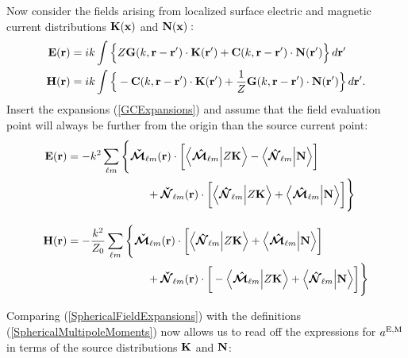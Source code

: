 \documentclass[letterpaper]{article}
\begin{document}
Now consider the fields arising from localized surface electric
and magnetic current distributions $\mathbf{K}(\mathbf{x})$ and $\mathbf{N}(\mathbf{x}):$
\begin{align*}
 \mathbf{E}(\mathbf{r}) 
&= 
   ik\int \Big\{ Z\mathbf{G}(k, \mathbf{r}-\mathbf{r}^\prime) \cdot \mathbf{K}(\mathbf{r}^\prime)
                 +\mathbf{C}(k, \mathbf{r}-\mathbf{r}^\prime) \cdot \mathbf{N}(\mathbf{r}^\prime)
          \Big\} \, d\mathbf{r}^\prime
\\
 \mathbf{H}(\mathbf{r}) 
&= 
   ik\int \Big\{ -\mathbf{C}(k, \mathbf{r}-\mathbf{r}^\prime) \cdot \mathbf{K}(\mathbf{r}^\prime)
                 +\frac{1}{Z}\mathbf{G}(k, \mathbf{r}-\mathbf{r}^\prime) \cdot \mathbf{N}(\mathbf{r}^\prime)
          \Big\}\,d\mathbf{r}^\prime.
\end{align*}
Insert the expansions (\ref{GCExpansions}) and assume that the 
field evaluation point will always be further from the origin than
the source current point: 
\begin{subequations}
\begin{align*}
 \mathbf{E}(\mathbf{r}) 
&= 
 -k^2 \sum_{\ell m} 
       \Bigg\{ \boldsymbol{\check{\mathcal{M}}}_{\ell m}(\mathbf{r}) \cdot 
               \bigg[   \Big\langle  \boldsymbol{\hat{\mathcal{M}}}_{\ell m}  \Big| Z \mathbf{K} \Big\rangle
                      - \Big\langle  \boldsymbol{\hat{\mathcal{N}}}_{\ell m}  \Big| \mathbf{N} \Big\rangle
               \bigg]
\\
&\hspace{1.0in}
             + \boldsymbol{\check{\mathcal{N}}}_{\ell m}(\mathbf{r}) \cdot 
               \bigg[   \Big\langle  \boldsymbol{\hat{\mathcal{N}}}_{\ell m}  \Big| Z \mathbf{K} \Big\rangle
                      + \Big\langle  \boldsymbol{\hat{\mathcal{M}}}_{\ell m}  \Big| \mathbf{N} \Big\rangle
               \bigg]
       \Bigg\}
\\[8pt]
 \mathbf{H}(\mathbf{r}) 
&= -\frac{k^2}{Z_0} \sum_{\ell m} 
       \Bigg\{ \boldsymbol{\check{\mathcal{M}}}_{\ell m}(\mathbf{r}) \cdot 
               \bigg[   \Big\langle  \boldsymbol{\hat{\mathcal{N}}}_{\ell m}  \Big| Z\mathbf{K} \Big\rangle
                      + \Big\langle  \boldsymbol{\hat{\mathcal{M}}}_{\ell m}  \Big| \mathbf{N} \Big\rangle
               \bigg]
\\
&\hspace{1.0in}
             + \boldsymbol{\check{\mathcal{N}}}_{\ell m}(\mathbf{r}) \cdot 
               \bigg[ - \Big\langle  \boldsymbol{\hat{\mathcal{M}}}_{\ell m}  \Big| Z\mathbf{K} \Big\rangle
                      + \Big\langle  \boldsymbol{\hat{\mathcal{N}}}_{\ell m}  \Big| \mathbf{N} \Big\rangle
               \bigg]
       \Bigg\}
\end{align*}
\label{SphericalFieldExpansions}
\end{subequations}

Comparing (\ref{SphericalFieldExpansions}) with the definitions
(\ref{SphericalMultipoleMoments}) now allows us to read off
the expressions for $a^{\hbox{\scriptsize{E,M}}}$ in terms of the source
distributions $\mathbf{K}$ and $\mathbf{N}$: 
\end{document}
